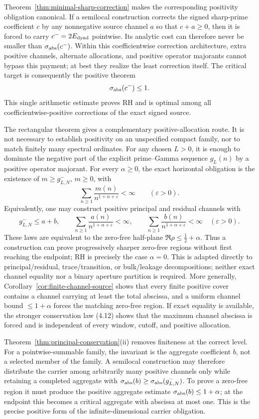 \documentclass[11pt]{article}
\begin{document}
Theorem~\ref{thm:minimal-sharp-correction} makes the corresponding positivity obligation
canonical.  If a semilocal construction corrects the signed sharp-prime coefficient $c$ by any
nonnegative source channel $a$ so that $c+a\ge0$, then it is forced to carry
$c^-=2E_{\rm dyad}$ pointwise.  Its analytic cost can therefore never be smaller than
$\sigma_{\rm abs}(c^-)$.  Within this coefficientwise correction architecture, extra positive
channels, alternate allocations, and positive operator majorants cannot bypass this payment; at
best they realize the least correction itself.  The
critical target is consequently the positive theorem
\[
 \sigma_{\rm abs}(c^-)\le1.
\]
This single arithmetic estimate proves RH and is optimal among all coefficientwise-positive
corrections of the exact signed source.

The rectangular theorem gives a complementary positive-allocation route.  It is not necessary to
establish positivity on an unspecified compact family, nor to match finitely many spectral
ordinates.  For any chosen $L>0$, it is enough to dominate the negative part of the explicit
prime--Gamma sequence $g_L(n)$ by a positive operator majorant.  For every $\alpha\ge0$, the
exact horizontal obligation is the existence of $m\ge g_{L,N}^-$, $m\ge0$, with
\[
 \sum_{n\ge1}\frac{m(n)}{n^{1+\alpha+\varepsilon}}<\infty
 \qquad(\varepsilon>0).
\]
Equivalently, one may construct positive principal and residual channels with
\[
 g_{L,N}^-\le a+b,
 \qquad
 \sum_{n\ge1}\frac{a(n)}{n^{1+\alpha+\varepsilon}}<\infty,
 \qquad
 \sum_{n\ge1}\frac{b(n)}{n^{1+\alpha+\varepsilon}}<\infty
 \quad(\varepsilon>0).
\]
These laws are equivalent to the zero-free half-plane
$\Re\rho\le\frac12+\alpha$.  Thus a construction can prove progressively sharper zero-free
regions without first reaching the endpoint; RH is precisely the case $\alpha=0$.
This is adapted directly to principal/residual, trace/transition, or bulk/leakage decompositions;
neither exact channel equality nor a binary aperture partition is required.  More generally,
Corollary~\ref{cor:finite-channel-source} shows that every finite positive cover contains a
channel carrying at least the total abscissa, and a uniform channel bound $\le1+\alpha$ forces the
matching zero-free region.  If exact equality is available, the stronger conservation law
\textup{(4.12)} shows that the maximum channel abscissa is forced and is independent of every
window, cutoff, and positive allocation.

Theorem~\ref{thm:principal-conservation}\textup{(ii)} removes finiteness at the correct level.
For a pointwise-summable family, the invariant is the aggregate coefficient $b$, not a selected
member of the family.  A semilocal construction may therefore distribute the carrier among
arbitrarily many positive channels only while retaining a completed aggregate with
$\sigma_{\rm abs}(b)\ge\sigma_{\rm abs}(g_{L,N}^-)$.  To prove a zero-free region it must produce
the positive aggregate estimate $\sigma_{\rm abs}(b)\le1+\alpha$; at the endpoint this becomes a
critical aggregate with abscissa at most one.  This is the precise positive form of the
infinite-dimensional carrier obligation.
\end{document}
